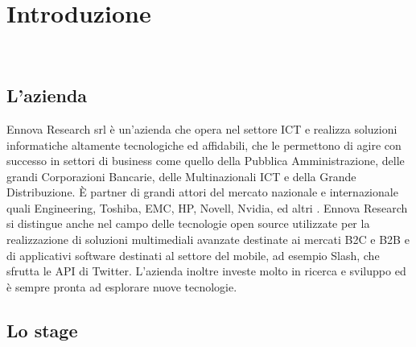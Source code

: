 
\chapter{Introduzione}
\label{cap:introduzione}

\\

%
%

\section{L'azienda}

Ennova Research srl è un’azienda che opera nel settore \gls{ICT} e realizza soluzioni
informatiche altamente tecnologiche ed affidabili, che le permettono di agire con
successo in settori di business come quello della Pubblica Amministrazione, delle grandi
Corporazioni Bancarie, delle Multinazionali \gls{ICT} e della Grande Distribuzione.
È partner di grandi attori del mercato nazionale e internazionale quali Engineering,
Toshiba, EMC, HP, Novell, Nvidia, ed altri .
Ennova Research si distingue anche nel campo delle tecnologie open source utilizzate per la
realizzazione di soluzioni multimediali avanzate destinate ai mercati \gls{B2C} e \gls{B2B} e di
applicativi software destinati al settore del mobile, ad esempio Slash, che sfrutta le \gls{API} di Twitter.
L'azienda inoltre investe molto in ricerca e sviluppo ed è sempre pronta ad esplorare nuove tecnologie.

\section{Lo stage}

